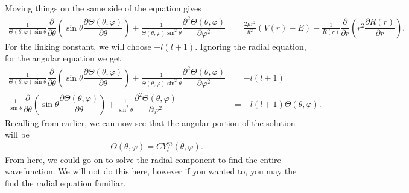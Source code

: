 \documentclass[11pt]{report}
\newcommand{\fdel}[2]{\dfrac{\partial{#1}}{\partial {#2}}} %
\newcommand{\sdel}[2]{\dfrac{\partial^2{#1}}{\partial{#2}^2}} %
\newcommand{\fpar}[1]{\left({#1}\right)}
\begin{document}
Moving things on the same side of the equation gives
    \begin{align*}
        \frac{1}{\Theta\fpar{\theta,\varphi}\sin\theta}\fdel{}{\theta}\fpar{\sin\theta\fdel{\Theta\fpar{\theta,\varphi}}{\theta}}+\frac{1}{\Theta\fpar{\theta,\varphi}\sin^2\theta}\sdel{\Theta\fpar{\theta,\varphi}}{\varphi}  &= \frac{2\mu r^2}{\hbar^2}\fpar{V(r)-E}-\frac{1}{R(r)}\fdel{}{r}\fpar{r^2\fdel{R(r)}{r}}.
    \end{align*}
For the linking constant, we will choose $-l(l+1)$. Ignoring the radial equation, for the angular equation we get
    \begin{align*}
        \frac{1}{\Theta\fpar{\theta,\varphi}\sin\theta}\fdel{}{\theta}\fpar{\sin\theta\fdel{\Theta\fpar{\theta,\varphi}}{\theta}}+\frac{1}{\Theta\fpar{\theta,\varphi}\sin^2\theta}\sdel{\Theta\fpar{\theta,\varphi}}{\varphi} &= -l\fpar{l+1}\\
        \frac{1}{\sin\theta}\fdel{}{\theta}\fpar{\sin\theta\fdel{\Theta\fpar{\theta,\varphi}}{\theta}}+\frac{1}{\sin^2\theta}\sdel{\Theta\fpar{\theta,\varphi}}{\varphi} &= -l\fpar{l+1}\Theta\fpar{\theta,\varphi}.
    \end{align*}
Recalling from earlier, we can now see that the angular portion of the solution will be
    \begin{align*}
        \Theta\fpar{\theta,\varphi} = CY_l^m\fpar{\theta,\varphi}.
    \end{align*}
From here, we could go on to solve the radial component to find the entire wavefunction. We will not do this here, however if you wanted to, you may the find the radial equation familiar. 






\end{document}

